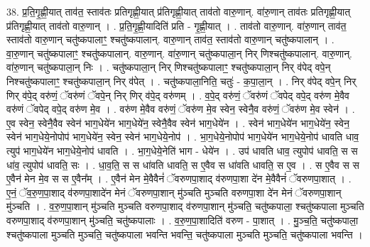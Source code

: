 \documentclass[17pt]{extarticle}
\begin{document}
38. प्र॒ति॒गृ॒ह्णी॒यात् ताव॑त॒ स्ताव॑तः प्रतिगृह्णी॒यात् प्र॑तिगृह्णी॒यात् ताव॑तो वारु॒णान्. वा॑रु॒णान् ताव॑तः प्रतिगृह्णी॒यात् प्र॑तिगृह्णी॒यात् ताव॑तो वारु॒णान् । . प्र॒ति॒गृ॒ह्णी॒यादिति॑ प्रति - गृ॒ह्णी॒यात् । . ताव॑तो वारु॒णान्. वा॑रु॒णान् ताव॑त॒ स्ताव॑तो वारु॒णान् चतु॑ष्कपालाꣳ॒॒ श्चतु॑ष्कपालान्. वारु॒णान् ताव॑त॒ स्ताव॑तो वारु॒णान् चतु॑ष्कपालान् । . वा॒रु॒णान् चतु॑ष्कपालाꣳ॒॒ श्चतु॑ष्कपालान्. वारु॒णान्. वा॑रु॒णान् चतु॑ष्कपाला॒न् निर् णिश्चतु॑ष्कपालान्. वारु॒णान्. वा॑रु॒णान् चतु॑ष्कपाला॒न् निः । . चतु॑ष्कपाला॒न् निर् णिश्चतु॑ष्कपालाꣳ॒॒ श्चतु॑ष्कपाला॒न् निर् व॑पेद् वपे॒न् निश्चतु॑ष्कपालाꣳ॒॒ श्चतु॑ष्कपाला॒न् निर् व॑पेत् । . चतु॑ष्कपाला॒निति॒ चतुः॑ - क॒पा॒ला॒न् । . निर् व॑पेद् वपे॒न् निर् णिर् व॑पे॒द् वरु॑णं॒ ॅवरु॑णं ॅवपे॒न् निर् णिर् व॑पे॒द् वरु॑णम् । . व॒पे॒द् वरु॑णं॒ ॅवरु॑णं ॅवपेद् वपे॒द् वरु॑ण मे॒वैव वरु॑णं ॅवपेद् वपे॒द् वरु॑ण मे॒व । . वरु॑ण मे॒वैव वरु॑णं॒ ॅवरु॑ण मे॒व स्वेन॒ स्वेनै॒व वरु॑णं॒ ॅवरु॑ण मे॒व स्वेन॑ । . ए॒व स्वेन॒ स्वेनै॒वैव स्वेन॑ भाग॒धेये॑न भाग॒धेये॑न॒ स्वेनै॒वैव स्वेन॑ भाग॒धेये॑न । . स्वेन॑ भाग॒धेये॑न भाग॒धेये॑न॒ स्वेन॒ स्वेन॑ भाग॒धेये॒नोपोप॑ भाग॒धेये॑न॒ स्वेन॒ स्वेन॑ भाग॒धेये॒नोप॑ । . भा॒ग॒धेये॒नोपोप॑ भाग॒धेये॑न भाग॒धेये॒नोप॑ धावति धाव॒ त्युप॑ भाग॒धेये॑न भाग॒धेये॒नोप॑ धावति । . भा॒ग॒धेये॒नेति॑ भाग - धेये॑न । . उप॑ धावति धाव॒ त्युपोप॑ धावति॒ स स धा॑व॒ त्युपोप॑ धावति॒ सः । . धा॒व॒ति॒ स स धा॑वति धावति॒ स ए॒वैव स धा॑वति धावति॒ स ए॒व । . स ए॒वैव स स ए॒वैन॑ मेन मे॒व स स ए॒वैन᳚म् । . ए॒वैन॑ मेन मे॒वैवैनं॑ ॅवरुणपा॒शाद् व॑रुणपा॒शा दे॑न मे॒वैवैनं॑ ॅवरुणपा॒शात् । . ए॒नं॒ ॅव॒रु॒ण॒पा॒शाद् व॑रुणपा॒शादे॑न मेनं ॅवरुणपा॒शान् मु॑ञ्चति मुञ्चति वरुणपा॒शा दे॑न मेनं ॅवरुणपा॒शान् मु॑ञ्चति । . व॒रु॒ण॒पा॒शान् मु॑ञ्चति मुञ्चति वरुणपा॒शाद् व॑रुणपा॒शान् मु॑ञ्चति॒ चतु॑ष्कपाला॒ श्चतु॑ष्कपाला मुञ्चति वरुणपा॒शाद् व॑रुणपा॒शान् मु॑ञ्चति॒ चतु॑ष्कपालाः । . व॒रु॒ण॒पा॒शादिति॑ वरुण - पा॒शात् । . मु॒ञ्च॒ति॒ चतु॑ष्कपाला॒ श्चतु॑ष्कपाला मुञ्चति मुञ्चति॒ चतु॑ष्कपाला भवन्ति भवन्ति॒ चतु॑ष्कपाला मुञ्चति मुञ्चति॒ चतु॑ष्कपाला भवन्ति । \newline
\pagebreak
{}
\end{document}
